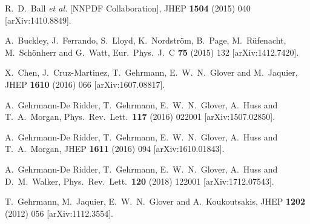 \documentclass[12pt]{article}
\begin{document}
\begin{thebibliography}{99}
  
   R.~D.~Ball {\it et al.} [NNPDF Collaboration],
  JHEP {\bf 1504} (2015) 040
  [arXiv:1410.8849].

  A.~Buckley, J.~Ferrando, S.~Lloyd, K.~Nordstr\"om, B.~Page, M.~R\"ufenacht, M.~Sch\"onherr and G.~Watt,
  Eur.\ Phys.\ J.\ C {\bf 75} (2015) 132
  [arXiv:1412.7420].

  X.~Chen, J.~Cruz-Martinez, T.~Gehrmann, E.~W.~N.~Glover and M.~Jaquier,
  JHEP {\bf 1610} (2016) 066
  [arXiv:1607.08817].

  A.~Gehrmann-De Ridder, T.~Gehrmann, E.~W.~N.~Glover, A.~Huss and T.~A.~Morgan,
  Phys.\ Rev.\ Lett.\  {\bf 117} (2016)   022001
  [arXiv:1507.02850].

  A.~Gehrmann-De Ridder, T.~Gehrmann, E.~W.~N.~Glover, A.~Huss and T.~A.~Morgan,
  JHEP {\bf 1611} (2016) 094
  [arXiv:1610.01843].
  
  A.~Gehrmann-De Ridder, T.~Gehrmann, E.~W.~N.~Glover, A.~Huss and D.~M.~Walker,
  Phys.\ Rev.\ Lett.\  {\bf 120} (2018)  122001
  [arXiv:1712.07543].

  T.~Gehrmann, M.~Jaquier, E.~W.~N.~Glover and A.~Koukoutsakis,
  JHEP {\bf 1202} (2012) 056
   [arXiv:1112.3554].


\end{thebibliography}
\end{document}
